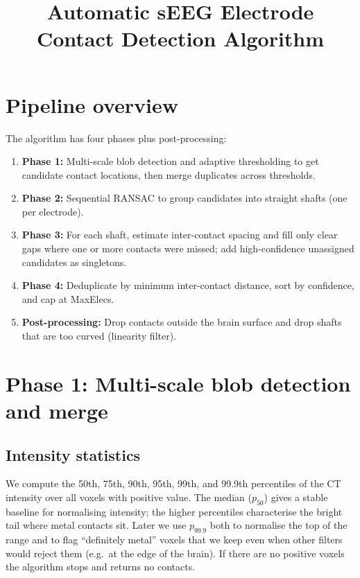 \documentclass[11pt,a4paper]{article}
\title{Automatic sEEG Electrode Contact Detection Algorithm}
\author{}
\date{}
\begin{document}
\maketitle

\section{Pipeline overview}
\label{sec:overview}

The algorithm has four phases plus post-processing:

\begin{enumerate}
\item \textbf{Phase 1:} Multi-scale blob detection and adaptive thresholding to get candidate contact locations, then merge duplicates across thresholds.
\item \textbf{Phase 2:} Sequential RANSAC to group candidates into straight shafts (one per electrode).
\item \textbf{Phase 3:} For each shaft, estimate inter-contact spacing and fill only clear gaps where one or more contacts were missed; add high-confidence unassigned candidates as singletons.
\item \textbf{Phase 4:} Deduplicate by minimum inter-contact distance, sort by confidence, and cap at MaxElecs.
\item \textbf{Post-processing:} Drop contacts outside the brain surface and drop shafts that are too curved (linearity filter).
\end{enumerate}

\section{Phase 1: Multi-scale blob detection and merge}
\label{sec:phase1}

\subsection{Intensity statistics}
We compute the 50th, 75th, 90th, 95th, 99th, and 99.9th percentiles of the CT intensity over all voxels with positive value. The median (\(p_{50}\)) gives a stable baseline for normalising intensity; the higher percentiles characterise the bright tail where metal contacts sit. Later we use \(p_{99.9}\) both to normalise the top of the range and to flag ``definitely metal'' voxels that we keep even when other filters would reject them (e.g.\ at the edge of the brain). If there are no positive voxels the algorithm stops and returns no contacts.
\end{document}

